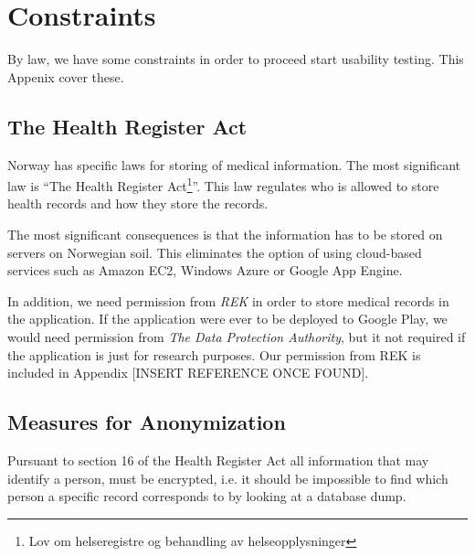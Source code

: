 
\chapter{Constraints}
\label{chp:securityrequirements}

By law, we have some constraints in order to proceed start usability testing. This Appenix cover these. 

\section{The Health Register Act}
\label{sec:helseregisterloven}

Norway has specific laws for storing of medical information. The most significant law is ``The Health Register Act\footnote{Lov om helseregistre og behandling av helseopplysninger}''\cite{helseregisterloven}. This law regulates who is allowed to store health records and how they store the records. 

The most significant consequences is that the information has to be stored on servers on Norwegian soil. This eliminates the option of using cloud-based services such as Amazon EC2, Windows Azure or Google App Engine. 

In addition, we need permission from \emph{REK}  in order to store medical records in the application. If the application were ever to be deployed to Google Play, we would need permission from \emph{The Data Protection Authority}, but it not required if the application is just for research purposes. Our permission from REK is included in Appendix [INSERT REFERENCE ONCE FOUND].

\section{Measures for Anonymization}
Pursuant to section 16 of the Health Register Act \cite{helseregisterloven} all information that may identify a person, must be encrypted, i.e. it should be impossible to find which person a specific record corresponds to by looking at a database dump.  